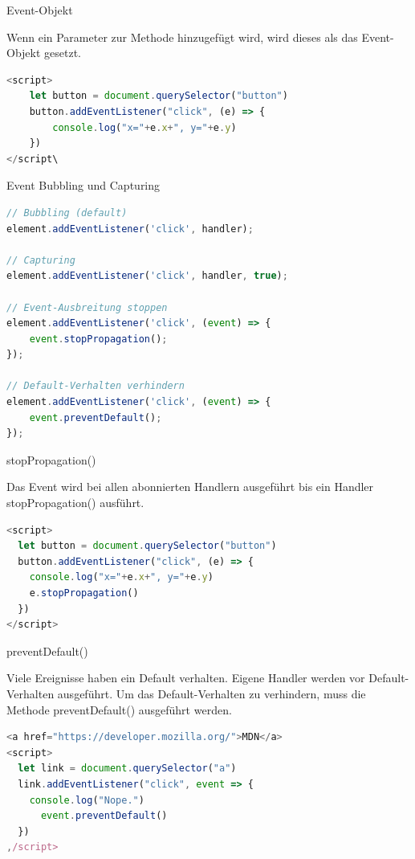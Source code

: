   
\begin{code}{Event-Objekt}

Wenn ein Parameter zur Methode hinzugefügt wird, wird dieses als das Event-Objekt gesetzt.
\begin{lstlisting}[language=JavaScript, style=basesmol]
<script>
    let button = document.querySelector("button")
    button.addEventListener("click", (e) => {
        console.log("x="+e.x+", y="+e.y)
    })
</script\
\end{lstlisting}
\end{code}

\begin{code}{Event Bubbling und Capturing}
\begin{lstlisting}[language=JavaScript, style=basesmol]
// Bubbling (default)
element.addEventListener('click', handler);

// Capturing
element.addEventListener('click', handler, true);

// Event-Ausbreitung stoppen
element.addEventListener('click', (event) => {
    event.stopPropagation();
});

// Default-Verhalten verhindern
element.addEventListener('click', (event) => {
    event.preventDefault();
});
\end{lstlisting}
\end{code}

\begin{examplecode}{stopPropagation()}

Das Event wird bei allen abonnierten Handlern ausgeführt bis ein Handler stopPropagation() ausführt.
\begin{lstlisting}[language=JavaScript, style=basesmol]
<script>
  let button = document.querySelector("button")
  button.addEventListener("click", (e) => {
    console.log("x="+e.x+", y="+e.y)
    e.stopPropagation()
  })
</script>
\end{lstlisting}
\end{examplecode}

\begin{examplecode}{preventDefault()}

Viele Ereignisse haben ein Default verhalten. Eigene Handler werden vor Default-Verhalten ausgeführt. Um das Default-Verhalten zu verhindern, muss die Methode preventDefault() ausgeführt werden.
\begin{lstlisting}[language=JavaScript, style=basesmol]
<a href="https://developer.mozilla.org/">MDN</a>
<script>
  let link = document.querySelector("a")
  link.addEventListener("click", event => {
    console.log("Nope.")
      event.preventDefault()
  })
,/script>
\end{lstlisting}
\end{examplecode}

